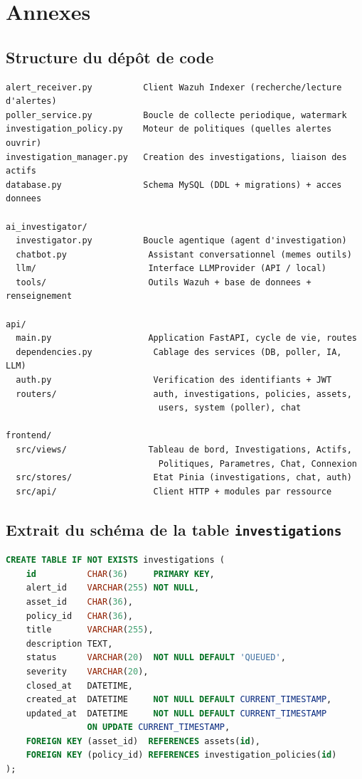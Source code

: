 \appendix
\chapter{Annexes}

\section{Structure du dépôt de code}

\begin{lstlisting}[language={}, caption={Arborescence simplifiée du projet}]
alert_receiver.py          Client Wazuh Indexer (recherche/lecture d'alertes)
poller_service.py          Boucle de collecte periodique, watermark
investigation_policy.py    Moteur de politiques (quelles alertes ouvrir)
investigation_manager.py   Creation des investigations, liaison des actifs
database.py                Schema MySQL (DDL + migrations) + acces donnees

ai_investigator/
  investigator.py          Boucle agentique (agent d'investigation)
  chatbot.py                Assistant conversationnel (memes outils)
  llm/                      Interface LLMProvider (API / local)
  tools/                    Outils Wazuh + base de donnees + renseignement

api/
  main.py                   Application FastAPI, cycle de vie, routes
  dependencies.py            Cablage des services (DB, poller, IA, LLM)
  auth.py                    Verification des identifiants + JWT
  routers/                   auth, investigations, policies, assets,
                              users, system (poller), chat

frontend/
  src/views/                Tableau de bord, Investigations, Actifs,
                              Politiques, Parametres, Chat, Connexion
  src/stores/                Etat Pinia (investigations, chat, auth)
  src/api/                   Client HTTP + modules par ressource
\end{lstlisting}

\section{Extrait du schéma de la table \texttt{investigations}}

\begin{lstlisting}[language=SQL, caption={Extrait de définition de la table
\texttt{investigations}}]
CREATE TABLE IF NOT EXISTS investigations (
    id          CHAR(36)     PRIMARY KEY,
    alert_id    VARCHAR(255) NOT NULL,
    asset_id    CHAR(36),
    policy_id   CHAR(36),
    title       VARCHAR(255),
    description TEXT,
    status      VARCHAR(20)  NOT NULL DEFAULT 'QUEUED',
    severity    VARCHAR(20),
    closed_at   DATETIME,
    created_at  DATETIME     NOT NULL DEFAULT CURRENT_TIMESTAMP,
    updated_at  DATETIME     NOT NULL DEFAULT CURRENT_TIMESTAMP
                ON UPDATE CURRENT_TIMESTAMP,
    FOREIGN KEY (asset_id)  REFERENCES assets(id),
    FOREIGN KEY (policy_id) REFERENCES investigation_policies(id)
);
\end{lstlisting}

